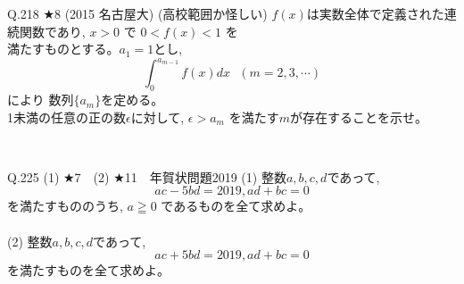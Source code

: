 \documentclass[twocolumn]{jsarticle}
\newcommand{\thm}{\begin{itembox}[l]}
\newcommand{\enthm}{\end{itembox}\\}
\renewcommand{\geq}{\geqq}
\newcommand{\hosi}{$\bigstar$}
\begin{document}
\thm{Q.218 $\bigstar 8$ (2015 名古屋大) (高校範囲か怪しい)}
$f(x)$は実数全体で定義された連続関数であり, $x>0$ で $0<f(x)<1$ を\\
満たすものとする。$a_1=1$とし,
\[\displaystyle\int_0^{a_{m-1}}f(x) dx    \,\,\,\,(m=2,3,\cdots )\]
により 数列$\{a_m\}$を定める。\\
1未満の任意の正の数$\epsilon$に対して, $\epsilon>a_m$ を満たす$m$が存在することを示せ。
\enthm






\thm{Q.225 (1) \hosi 7　(2) \hosi 11　年賀状問題2019}
(1) 整数$a,b,c,d$であって,
\[ac-5bd=2019,　　ad+bc=0\]
を満たすもののうち, $a\geq 0$ であるものを全て求めよ。\\
\\
(2) 整数$a,b,c,d$であって,
\[ac+5bd=2019,　　ad+bc=0\]
を満たすものを全て求めよ。
\enthm
\end{document}
